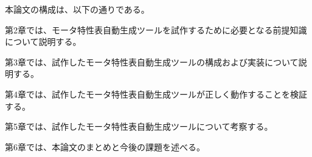 
本論文の構成は、以下の通りである。

第2章では、モータ特性表自動生成ツールを試作するために必要となる前提知識について説明する。

第3章では、試作したモータ特性表自動生成ツールの構成および実装について説明する。

第4章では、試作したモータ特性表自動生成ツールが正しく動作することを検証する。

第5章では、試作したモータ特性表自動生成ツールについて考察する。

第6章では、本論文のまとめと今後の課題を述べる。
